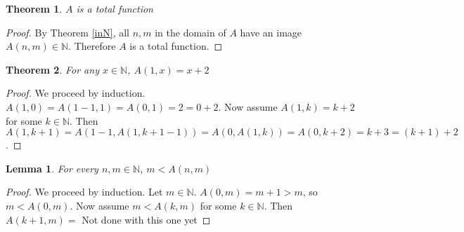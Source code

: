 \documentclass[12pt, letterpaper]{article}
\newtheorem{theorem}{Theorem}
\newtheorem{lemma}{Lemma}
\theoremstyle{case}
\begin{document}
    \begin{theorem}
      $A$ is a total function
    \end{theorem}
    \begin{proof}
      By Theorem \ref{inN}, all $n, m$ in the domain of $A$ have an image $A(n, m) \in \mathbb{N}$.
      Therefore $A$ is a total function.
    \end{proof}

    \begin{theorem}
      \label{x+2=A(1,x)}
      For any $x \in \mathbb{N}$, $A(1, x) = x + 2$
    \end{theorem}
    \begin{proof}
      We proceed by induction. \\
      $A(1, 0) = A(1 - 1, 1) = A(0, 1) = 2 = 0 + 2$. Now assume $A(1, k) = k + 2$ for some $k \in \mathbb{N}$.
      Then $A(1, k + 1) = A(1 - 1, A(1, k + 1 - 1)) = A(0, A(1, k)) = A(0, k + 2) = k + 3 = (k + 1) + 2$.
    \end{proof}

    \begin{lemma}
      \label{m<A(n,m)}
      For every $n, m \in \mathbb{N}$, $m < A(n, m)$
    \end{lemma}
    \begin{proof}
      We proceed by induction.
      Let $m \in \mathbb{N}$.
      $A(0, m) = m + 1 > m$, so $m < A(0, m)$.
      Now assume $m < A(k, m)$ for some $k \in \mathbb{N}$.
      Then $A(k + 1, m) = $
      Not done with this one yet
    \end{proof}
\end{document}

